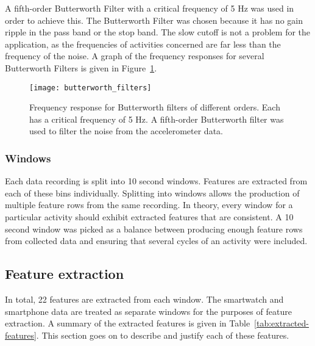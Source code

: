         A fifth-order Butterworth Filter with a critical frequency of 5 \si{Hz} was used in order to achieve this. The Butterworth Filter was chosen because it has no gain ripple in the pass band or the stop band. The slow cutoff is not a problem for the application, as the frequencies of activities concerned are far less than the frequency of the noise. A graph of the frequency responses for several Butterworth Filters is given in Figure~\ref{fig:butterworth_filters}.
        
        \begin{figure}
          \centering
          \texttt{[image: butterworth\_filters]}
          \caption{Frequency response for Butterworth filters of different orders. Each has a critical frequency of 5 \si{Hz}. A fifth-order Butterworth filter was used to filter the noise from the accelerometer data.}
          \label{fig:butterworth_filters}
        \end{figure}
        
      \subsubsection{Windows}
        Each data recording is split into 10 second windows. Features are extracted from each of these bins individually. Splitting into windows allows the production of multiple feature rows from the same recording. In theory, every window for a particular activity should exhibit extracted features that are consistent. A 10 second window was picked as a balance between producing enough feature rows from collected data and ensuring that several cycles of an activity were included. 
      
    \subsection{Feature extraction}
      \label{sec:feature-extraction}
      In total, 22 features are extracted from each window. The smartwatch and smartphone data are treated as separate windows for the purposes of feature extraction. A summary of the extracted features is given in Table~\ref{tab:extracted-features}. This section goes on to describe and justify each of these features.
      
